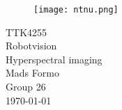 \documentclass{article}
\begin{document}
\begin{titlepage}
      \begin{center}
        \begin{figure}[h!]
            \centering
            \texttt{[image: ntnu.png]}
            \label{fig:ntnu}
        \end{figure}
        \vspace*{1cm}
        {\Large{TTK4255}}\\[0.4cm] 
        \Huge{Robotvision}\\[0.5cm]
        {\Large{Hyperspectral imaging}\vspace*{0.5cm}\\ Mads Formo \\ Group 26}\\[0.4cm] 
        \large{\today}
        \vspace{1cm}
    \end{center}
    \vspace*{\fill}
\end{titlepage}



\thispagestyle{empty} %
\linespread{1.15}
\newpage
\tableofcontents{}
\def\tableofcontentsname{test}
\thispagestyle{empty} %


\newpage
\setcounter{page}{1}
%











%


\newpage
{}
\printbibliography{}
\label{sec:references}
\end{document}
